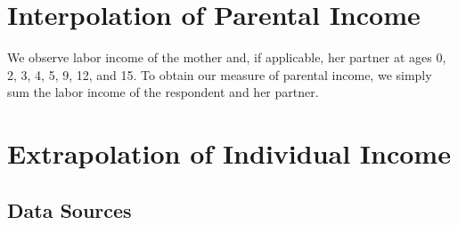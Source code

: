 \section{Interpolation of Parental Income}
\label{app:parent_income}


\noindent We observe labor income of the mother and, if applicable, her partner at
ages 0, 2, 3, 4, 5, 9, 12, and 15. To obtain our measure of parental income, we simply
sum the labor income of the respondent and her partner. \\





\setcounter{figure}{0}  \renewcommand{\thefigure}{K.\arabic{figure}}
\setcounter{table}{0}   \renewcommand{\thetable}{Ks.\arabic{table}}
\section{Extrapolation of Individual Income}
\label{app:subject_income}

\subsection{Data Sources}

